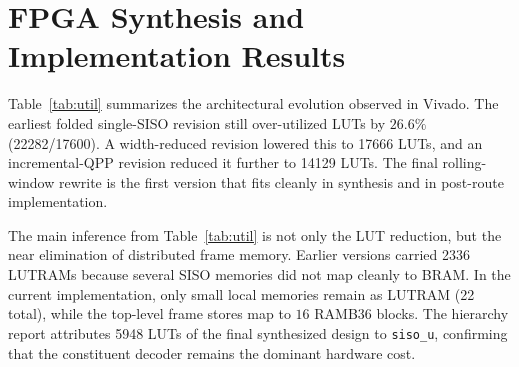 \documentclass[conference]{IEEEtran}
\begin{document}
\section{FPGA Synthesis and Implementation Results}
Table~\ref{tab:util} summarizes the architectural evolution observed in Vivado. The earliest folded single-SISO revision still over-utilized LUTs by \(26.6\%\) (\num{22282}/\num{17600}). A width-reduced revision lowered this to \num{17666} LUTs, and an incremental-QPP revision reduced it further to \num{14129} LUTs. The final rolling-window rewrite is the first version that fits cleanly in synthesis and in post-route implementation.

\begin{table}[t]
\caption{Vivado Resource Evolution on \texttt{xc7z010clg400-1}}
\label{tab:util}
\centering
\scriptsize
\setlength{\tabcolsep}{4pt}
\renewcommand{\arraystretch}{1.05}
\end{table}

The main inference from Table~\ref{tab:util} is not only the LUT reduction, but the near elimination of distributed frame memory. Earlier versions carried \num{2336} LUTRAMs because several SISO memories did not map cleanly to BRAM. In the current implementation, only small local memories remain as LUTRAM (\num{22} total), while the top-level frame stores map to \(16\) RAMB36 blocks. The hierarchy report attributes \num{5948} LUTs of the final synthesized design to \texttt{siso\_u}, confirming that the constituent decoder remains the dominant hardware cost.
\end{document}
